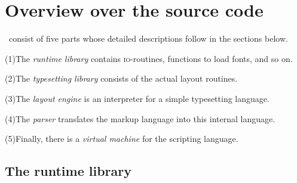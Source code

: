 \section{Overview over the source code}   %

\ant\ consist of five parts whose detailed descriptions follow in the sections below.

\begin{list}
\item{(1)}The \emph{runtime library} contains \textsc{io}-routines, functions to load fonts,
  and so on.
\item{(2)}The \emph{typesetting library} consists of the actual layout routines.
\item{(3)}The \emph{layout engine} is an interpreter for a simple typesetting language.
\item{(4)}The \emph{parser} translates the markup language into this internal language.
\item{(5)}Finally, there is a \emph{virtual machine} for the scripting language.
\end{list}

\subsection{The runtime library}   %

